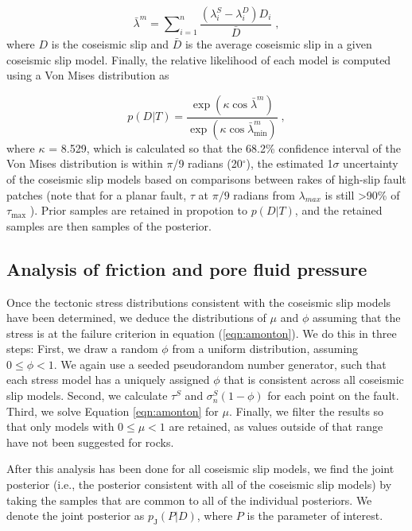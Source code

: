 \documentclass[draft,jgrga]{AGUTeX}
\begin{document}
\begin{article}
\begin{equation}
\bar{\lambda}^m = \sum \nolimits_{i=1}^n \frac{(\lambda^S_i - \lambda^D_i) D_i} 
{\bar{ D}} \; ,
\label{eqn:rake_misfit}
\end{equation}
where $D$ is the coseismic slip and $\bar{D}$ is the average coseismic
slip in a given coseismic slip model. Finally, the relative likelihood
of each model is computed using a Von Mises distribution as

\begin{equation}
p (D | T) = \frac{ \exp ( \kappa \cos \bar{\lambda}^m )} 
{\exp (\kappa \cos \bar{\lambda}^m_{\min})} \;,
\label{eqn:rel_likelihood}
\end{equation}
where $\kappa$ = 8.529, which is calculated so that the 68.2\%
confidence interval of the Von Mises distribution is within $\pi$/9 radians
(20$^{\circ}$), the estimated 1$\sigma$ uncertainty of the coseismic
slip models based on comparisons between rakes of high-slip fault
patches (note that for a planar fault, $\tau$ at $\pi/9$ radians from
$\lambda_{max}$ is still \textgreater{}90\% of $\tau_{\mathrm{\max}}$
\citep{lisle2013}). Prior samples are retained in propotion to $p(D|T)$,
and the retained samples are then samples of the posterior.

\subsection{Analysis of friction and pore fluid
pressure}\label{analysis-of-friction-and-pore-fluid-pressure}

Once the tectonic stress distributions consistent with the coseismic
slip models have been determined, we deduce the distributions of $\mu$
and $\phi$ assuming that the stress is at the failure criterion in
equation (\ref{eqn:amonton}). We do this in three steps: First, we draw
a random $\phi$ from a uniform distribution, assuming $0 \leq \phi < 1$.
We again use a seeded pseudorandom number generator, such that each
stress model has a uniquely assigned $\phi$ that is consistent 
across all coseismic slip models. Second, we calculate $\tau^S$ and
$\sigma_n^S(1-\phi)$ for each point on the fault. Third, we solve
Equation \ref{eqn:amonton} for $\mu$. Finally, we filter the results so
that only models with $0 \le \mu < 1$ are retained, as values outside of
that range have not been suggested for rocks.

After this analysis has been done for all coseismic slip models, we find
the joint posterior (i.e., the posterior consistent with all of the
coseismic slip models) by taking the samples that are common to all of
the individual posteriors. We denote the joint posterior as
$p_{\mathrm{J}}(P | D)$, where $P$ is the parameter of interest.


\end{article}
\end{document}
